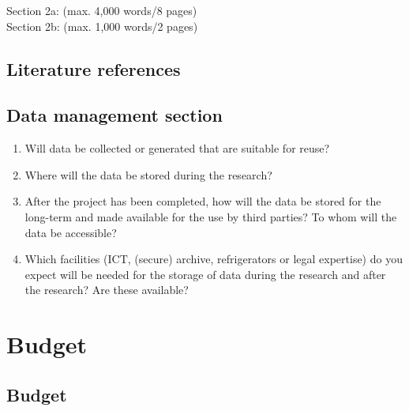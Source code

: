 \documentclass[10pt]{article}
\newcommand{\cmark}{$\checkmark$}%
\newcommand{\done}{\rlap{\color{sectionblue}$\square$}{\raisebox{2pt}{\large\hspace{1pt}\cmark}}\hspace{-2.5pt}}
\newcommand{\wordcount}[1]{}
\begin{document}
\begin{NoHyper}
	\noindent
	Section 2a: \quad \wordcount{A description of the proposed research} \quad (max. 4,000 words/8 pages)\\
	Section 2b: \quad \wordcount{Scientific and} \quad (max. 1,000 words/2 pages)
	
	\subsection{Literature references}
    {\fontsize{8.5}{8.5}\selectfont
% 	
	
	}
	
		
	\subsection{Data management section}
	
	\begin{enumerate}
		\item Will data be collected or generated that are suitable for reuse?
	    \item Where will the data be stored during the research?\\
    	\item After the project has been completed, how will the data be stored for the long-term and made available for the use by third parties? To whom will the data be accessible?\\
		\item Which facilities (ICT, (secure) archive, refrigerators or legal expertise) do you expect will be needed for the storage of data during the research and after the research? Are these available?\\
	\end{enumerate}
	\end{NoHyper}
	\section{Budget}
	
	\subsection{Budget}
	
\end{document}

